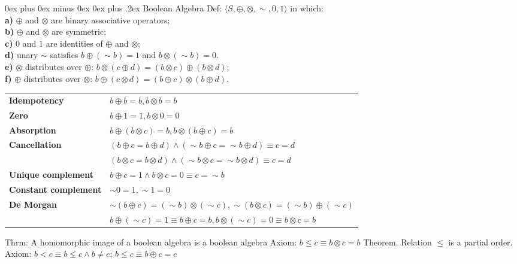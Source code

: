 \documentclass[letterpaper, 8pt]{extarticle}
\makeatletter
\renewcommand{\subsection}{\@startsection{subsection}{2}{0mm}%
                                {0ex plus 0ex minus 0ex}%
                                {0ex plus .2ex}%
                                {\normalfont\small\bfseries}}
\makeatother
\begin{document}
\begin{multicols*}{3}
    \subsection{Boolean Algebra}
    Def: $\langle S, \oplus, \otimes, \sim, 0, 1 \rangle$ in which: \\
    \textbf{a)} $\oplus$ and $\otimes$ are binary associative operators; \\
    \textbf{b)} $\oplus$ and $\otimes$ are symmetric; \\
    \textbf{c)} $0$ and $1$ are identities of $\oplus$ and $\otimes$; \\
    \textbf{d)} unary $\sim$ satisfies $b \oplus (\sim b) = 1$ and $b \otimes (\sim b) = 0$. \\
    \textbf{e)} $\otimes$ distributes over $\oplus$: $b \otimes (c \oplus d) = (b \otimes c) \oplus (b \otimes d)$; \\
    \textbf{f)} $\oplus$ distributes over $\otimes$: $b \oplus (c \otimes d) = (b \oplus c) \otimes (b \oplus d)$.

    \begin{tabulary}{\linewidth}{@{}LL@{}}
        \textbf{Idempotency} & $b \oplus b = b, b \otimes b = b$ \\
        \textbf{Zero} & $b \oplus 1 = 1, b \otimes 0 = 0$ \\
        \textbf{Absorption} & $b \oplus (b \otimes c) = b, b \otimes (b \oplus c) = b$ \\
        \textbf{Cancellation} & $(b \oplus c = b \oplus d) \land (\sim b \oplus c = \sim b \oplus d) \equiv c = d$ \\
        & $(b \otimes c = b \otimes d) \land (\sim b \otimes c = \sim b \otimes d) \equiv c = d$ \\
        \textbf{Unique complement} & $b \oplus c = 1 \land b \otimes c = 0 \equiv c = \sim b$ \\
        \textbf{Constant complement} & $\sim 0 = 1, \sim 1 = 0$ \\
        \textbf{De Morgan} & $\sim (b \oplus c) = (\sim b) \otimes (\sim c), \sim (b \otimes c) = (\sim b) \oplus (\sim c)$ \\
        & $b \oplus (\sim c) = 1 \equiv b \oplus c = b, b \otimes (\sim c) = 0 \equiv b \otimes c = b$ \\
    \end{tabulary}

    Thrm: A homomorphic image of a boolean algebra is a boolean algebra
    Axiom: $b \leq c \equiv b \otimes c = b$ Theorem. Relation $\leq$ is a partial order.
    Axiom: $b < c \equiv b \leq c \land b \neq c$; $b \leq c \equiv b \oplus c = c$


\end{multicols*}
\end{document}
